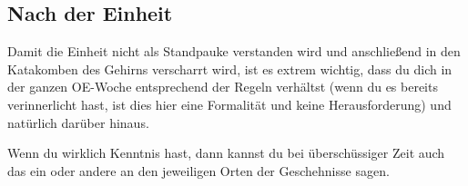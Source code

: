 \documentclass[a4paper,11pt]{scrartcl} %
\begin{document}
  \subsection{Nach der Einheit} 
Damit die Einheit nicht als Standpauke verstanden wird und anschließend in den Katakomben des Gehirns verscharrt wird, ist es extrem wichtig, dass du dich in der ganzen OE-Woche entsprechend der Regeln verhältst (wenn du es bereits verinnerlicht hast, ist dies hier eine Formalität und keine Herausforderung) und natürlich darüber hinaus.

Wenn du wirklich Kenntnis hast, dann kannst du bei überschüssiger Zeit auch das ein oder andere an den jeweiligen Orten der Geschehnisse sagen.
\end{document}
